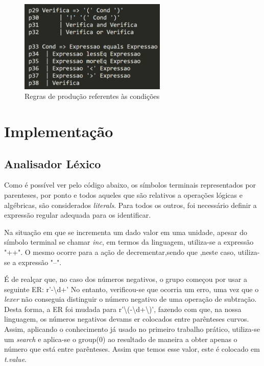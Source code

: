 \documentclass[11pt,a4paper]{report}
\begin{document}
\begin{figure}[hbt!]
	\centering
	\includegraphics[width=70mm,scale = 1]{images/verifica}
	\caption{Regras de produção referentes às condições}
	\label{fig:instruções}
\end{figure}

\section{Implementação}
\subsection{Analisador Léxico}
Como é possível ver pelo código abaixo, os símbolos terminais representados por parenteses, por ponto e todos aqueles que são relativos a operações lógicas e algébricas, são considerados \textit{literals}. Para todos os outros, foi necessário definir a expressão regular adequada para os identificar. \par
Na situação em que se incrementa um dado valor em uma unidade, apesar do símbolo terminal se chamar \textit{inc}, em termos da linguagem, utiliza-se a expressão "++". O mesmo ocorre para a ação de decrementar,sendo que ,neste caso, utiliza-se a expressão "--".\par
É de realçar que, no caso dos números negativos, o grupo começou por usar a seguinte ER:  r'-\textbackslash d+' 
 No entanto, verificou-se que ocorria um erro, uma vez que o \textit{lexer} não conseguia distinguir o número negativo de uma operação de subtração. Desta forma, a ER foi mudada para r'\textbackslash(-\textbackslash d+\textbackslash)', fazendo com que, na nossa linguagem, os números negativos devams er colocados entre parênteses curvos. Assim, aplicando o conhecimento já usado no primeiro trabalho prático, utiliza-se um \textit{search} e aplica-se o group(0) ao resultado de maneira a obter apenas o número que está entre parênteses. Assim que temos esse valor, este é colocado em \textit{t.value}.
\end{document}
